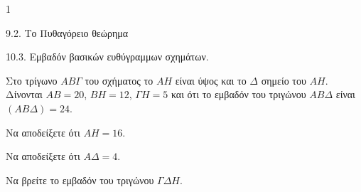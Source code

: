 \begin{ylh}{1}
    \item 9.2. Το Πυθαγόρειο θεώρημα
    \item 10.3. Εμβαδόν βασικών ευθύγραμμων σχημάτων.
\end{ylh}
\begin{figure}
    \centering
\end{figure}

Στο τρίγωνο $AB\Gamma$ του σχήματος το $AH$ είναι ύψος και το $\Delta$ σημείο του $AH$. Δίνονται $AB = 20$, $BH = 12$, $\Gamma H = 5$ και ότι το εμβαδόν του τριγώνου $AB\Delta$ είναι $(AB\Delta) = 24$.
\begin{alist}
    \item Να αποδείξετε ότι $AH = 16$. 
    \item Να αποδείξετε ότι $A\Delta = 4$. 
    \item Να βρείτε το εμβαδόν του τριγώνου $\Gamma\Delta H$. 
\end{alist}